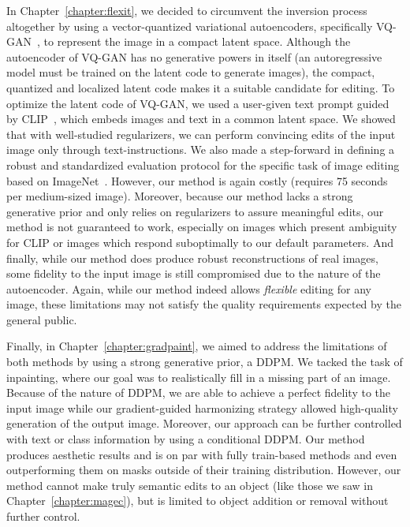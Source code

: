 In Chapter~\ref{chapter:flexit}, we decided to circumvent the inversion process altogether by using a vector-quantized  variational autoencoders, 
specifically VQ-GAN~\citep{esser2021taming}, to represent the image in a compact latent space. Although the autoencoder of VQ-GAN has no 
generative powers in itself (an autoregressive model must be trained on the latent code to generate images), the compact, quantized and localized 
latent code makes it a suitable candidate for editing. To optimize the latent code of VQ-GAN, we used a user-given text prompt guided by 
 \ac{CLIP}~\citep{radford2021learning}, 
which embeds images and text in a common latent space. We showed that with well-studied regularizers, we can perform convincing edits of the input 
image only through text-instructions. We also made a step-forward in defining a robust and standardized evaluation protocol for the specific task of
 image editing based on ImageNet~\citep{deng2009imagenet}. However, our method is again costly (requires 75 seconds per medium-sized image). 
 Moreover, because our method lacks a strong generative prior and only relies on regularizers to assure meaningful edits, our method is not guaranteed to work, 
 especially on images which present ambiguity for \ac{CLIP} or images which respond suboptimally to our default parameters. And finally, while our method 
 does produce robust reconstructions of real images, some fidelity to the input image is still compromised due to the nature of the autoencoder. Again, 
 while our method indeed allows \emph{flexible} editing for any image, these limitations may not satisfy the quality requirements expected by the general public.

Finally, in Chapter~\ref{chapter:gradpaint}, we aimed to address the limitations of both methods by using a strong generative prior, a \ac{DDPM}. We 
tacked the task of inpainting, where our goal was to realistically fill in a missing part of an image. Because of the nature of \ac{DDPM}, we are able 
to achieve a perfect fidelity to the input image while our gradient-guided harmonizing strategy allowed high-quality generation of the output image.
Moreover, our approach can be further controlled with text or class information by using a conditional \ac{DDPM}. Our method produces aesthetic results
and is on par with fully train-based methods and even outperforming them on masks outside of their training distribution. However, our method cannot make 
truly semantic edits to an object (like those we saw in Chapter~\ref{chapter:magec}), but is limited to object addition or removal without further control.

